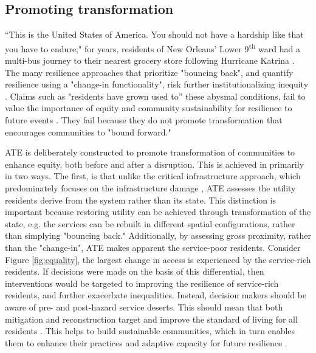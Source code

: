 \documentclass[9pt,twocolumn,twoside,lineno]{pnas-new}
\begin{document}
\subsection*{Promoting transformation}
“This is the United States of America. You should not have a hardship like that you have to endure;"
for years, residents of New Orleans' Lower 9\textsuperscript{th} ward had a multi-bus journey to their nearest grocery store following Hurricane Katrina \cite{Netter2016-dm}.
The many resilience approaches that prioritize "bouncing back", and quantify resilience using a "change-in functionality", risk further institutionalizing inequity \cite{Normandin2019-hp, I_Sudmeier-Rieux2014-lc, MacKinnon2013-nx}.
Claims such as "residents have grown used to” these abysmal conditions, fail to value the importance of equity and community sustainability for resilience to future events \cite{Dempsey2011-og, Pantelic1991-qu}.
They fail because they do not promote transformation that encourages communities to "bound forward."

ATE is deliberately constructed to promote transformation of communities to enhance equity, both before and after a disruption. 
This is achieved in primarily in two ways.
The first, is that unlike the critical infrastructure approach, which predominately focuses on the infrastructure damage \cite{Cutter2010-vg}, ATE assesses the utility residents derive from the system rather than its state. 
This distinction is important because restoring utility can be achieved through transformation of the state, e.g. the services can be rebuilt in different spatial configurations, rather than simplying "bouncing back."
Additionally, by assessing gross proximity, rather than the "change-in", ATE makes apparent the service-poor residents. 
Consider Figure \ref{fig:equality}, the largest change in access is experienced by the service-rich residents.
If decisions were made on the basis of this differential, then interventions would be targeted to improving the resilience of service-rich residents, and further exacerbate inequalities.
Instead, decision makers should be aware of pre- and post-hazard service deserts. 
This should mean that both mitigation and reconstruction target and improve the standard of living for all residents \cite{Pantelic1991-qu}. 
This helps to build sustainable communities, which in turn enables them to enhance their practices and adaptive capacity for future resilience \cite{Saunders2015-uz}. 
\end{document}
